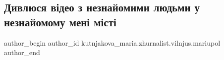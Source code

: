  
 
 
 
 

\subsection{Дивлюся відео з незнайомими людьми у незнайомому мені місті}
\label{sec:09_05_2022.fb.kutnjakova_maria.zhurnalist.vilnjus.mariupol.1.dyvljusja_video_z_neznajomymy_ljudmy_u_neznajomomu_meni_misti}

\ifcmt
 author_begin
   author_id kutnjakova_maria.zhurnalist.vilnjus.mariupol
 author_end
\fi
